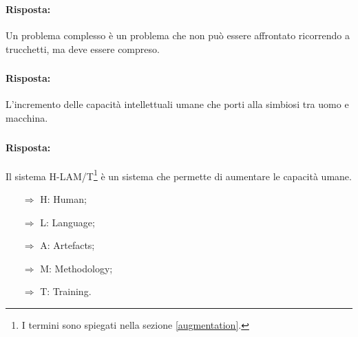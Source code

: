 \subsubsection{}


\paragraph{Risposta:} Un problema complesso è un problema che non può essere affrontato ricorrendo a trucchetti, ma deve essere compreso.

\subsubsection{}


\paragraph{Risposta:} L'incremento delle capacità intellettuali umane che porti alla simbiosi
tra uomo e macchina.

\subsubsection{}


\paragraph{Risposta:} Il sistema H-LAM/T\footnote{I termini sono spiegati nella sezione \ref{augmentation}.} è un sistema che permette di aumentare le capacità umane.

\begin{itemize}
    \item [$\Rightarrow$] H: Human;
    \item [$\Rightarrow$] L: Language;
    \item [$\Rightarrow$] A: Artefacts;
    \item [$\Rightarrow$] M: Methodology;
    \item [$\Rightarrow$] T: Training.
\end{itemize}

